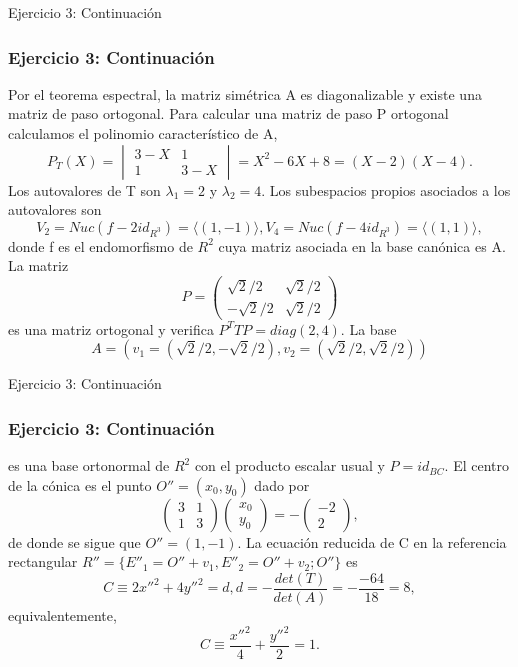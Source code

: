 \documentclass[xcolor={dvipsnames},aspectratio=169,10pt]{beamer}
\begin{document}
\begin{frame}{Ejercicio 3: Continuación}
  \frametitle{Ejercicio 3: Continuación}
    Por el teorema espectral, la matriz simétrica A es diagonalizable y existe una matriz de paso ortogonal. Para calcular una matriz de paso P ortogonal calculamos el polinomio característico de A,
    \[P_T(X) = \begin{vmatrix} 3 - X & 1 \\ 1 & 3 - X \end{vmatrix} = X^2 - 6X + 8 = (X - 2)(X - 4).\]
    Los autovalores de T son $\lambda_1 = 2$ y $\lambda_2 = 4$. Los subespacios propios asociados a los autovalores son
    \[V_2 = Nuc (f - 2 id_{R^3}) = \langle(1, -1)\rangle, V_4 = Nuc (f - 4 id_{R^3}) = \langle(1, 1)\rangle,\]
    donde f es el endomorfismo de $R^2$ cuya matriz asociada en la base canónica es A. La matriz
    \[P = \begin{pmatrix} \sqrt{2}/2 & \sqrt{2}/2 \\ -\sqrt{2}/2 & \sqrt{2}/2 \end{pmatrix}\]
    es una matriz ortogonal y verifica $P^T T P = diag (2, 4)$. La base
    \[A = (v_1 = (\sqrt{2}/2, -\sqrt{2}/2), v_2 = (\sqrt{2}/2, \sqrt{2}/2))\]
\end{frame}

\begin{frame}{Ejercicio 3: Continuación}
  \frametitle{Ejercicio 3: Continuación}
    es una base ortonormal de $R^2$ con el producto escalar usual y $P = id_{BC}$. El centro de la cónica es el punto $O'' = (x_0, y_0)$ dado por 
    \[\begin{pmatrix} 3 & 1 \\ 1 & 3 \end{pmatrix} \begin{pmatrix} x_0 \\ y_0 \end{pmatrix} = -\begin{pmatrix} -2 \\ 2 \end{pmatrix},\]
    de donde se sigue que $O'' = (1, -1)$. La ecuación reducida de C en la referencia rectangular $R'' = \{E''_1 = O'' + v_1, E''_2 = O'' + v_2; O''\}$ es
    \[C \equiv 2 x''^2 + 4 y''^2 = d, d = - \frac{det(T)}{det(A)} = - \frac{-64}{18} = 8,\]
    equivalentemente,
    \[C \equiv \frac{x''^2}{4} + \frac{y''^2}{2} = 1.\]
\end{frame}
\end{document}

